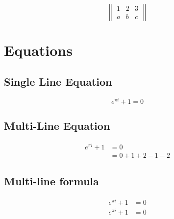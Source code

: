 \[
\begin{Vmatrix}
	1 & 2 & 3\\
	a & b & c
\end{Vmatrix}
\]

\section{Equations}

\subsection{Single Line Equation}
\begin{equation}
	e^{\pi i} + 1 = 0
\end{equation}

\subsection{Multi-Line Equation}
\begin{equation}
\begin{split}
e^{\pi i} + 1 & = 0 \\
 				    & = 0 + 1 + 2 - 1 - 2 
\end{split}
\end{equation}

\subsection{Multi-line formula}
\begin{align*}
	e^{\pi i} + 1 & =  0 \\
	e^{\pi i} + 1 & =  0 
\end{align*}



